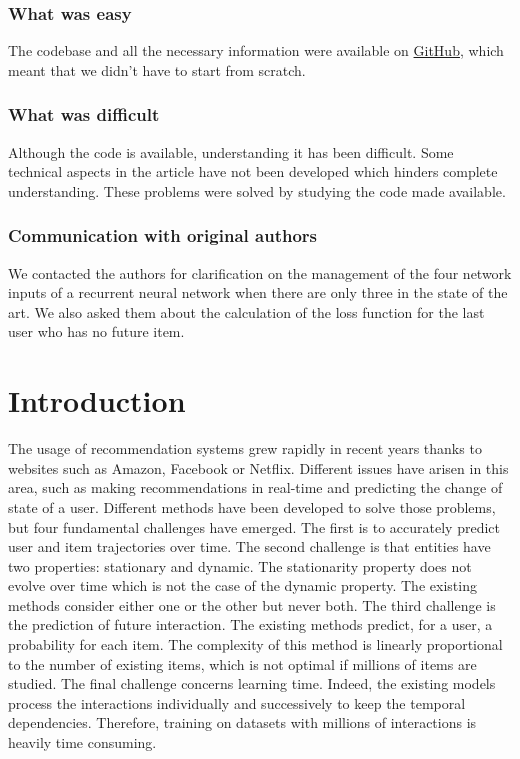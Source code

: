 \subsubsection{What was easy}

The codebase and all the necessary information were available on \href{https://github.com/srijankr/jodie}{GitHub}, which meant that we didn't have to start from scratch.

\subsubsection{What was difficult}

Although the code is available, understanding it has been difficult. Some technical aspects in the article have not been developed which hinders complete understanding. These problems were solved by studying the code made available.

\subsubsection{Communication with original authors}

We contacted the authors for clarification on the management of the four network inputs of a recurrent neural network when there are only three in the state of the art. We also asked them about the calculation of the loss function for the last user who has no future item.

\newpage

\section*{Introduction}

The usage of recommendation systems grew rapidly in recent years thanks to websites such as Amazon, Facebook or Netflix. Different issues have arisen in this area, such as making recommendations in real-time and predicting the change of state of a user. Different methods have been developed to solve those problems, but four fundamental challenges have emerged. The first is to accurately predict user and item trajectories over time. The second challenge is that entities have two properties: stationary and dynamic. The stationarity property does not evolve over time which is not the case of the dynamic property. The existing methods consider either one or the other but never both. The third challenge is the prediction of future interaction. The existing methods predict, for a user, a probability for each item. The complexity of this method is linearly proportional to the number of existing items, which is not optimal if millions of items are studied. The final challenge concerns learning time. Indeed, the existing models process the interactions individually and successively to keep the temporal dependencies. Therefore, training on datasets with millions of interactions is heavily time consuming.\\

